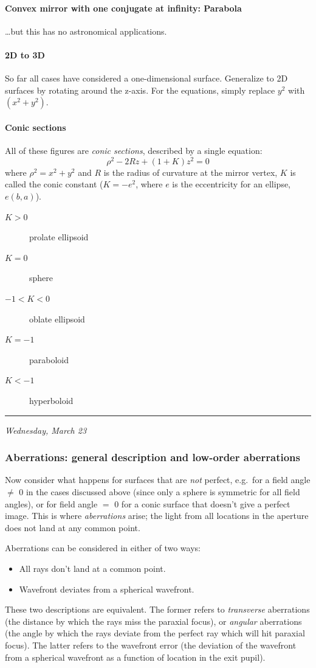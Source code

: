 \documentclass[12pt]{article}
\newcommand{\mydate}[1]{
    \begin{flushright}
        \rule{\textwidth}{0.4pt} %
        \footnotesize\hfill\textit{#1}
    \end{flushright}}
\begin{document}
\paragraph{Convex mirror with one conjugate at infinity: Parabola}
\ldots but this has no astronomical applications.

\paragraph{2D to 3D}
So far all cases have considered a one-dimensional surface.
Generalize to 2D surfaces by rotating around the z-axis.
For the equations, simply replace $y^{2}$ with $(x^{2} + y^{2})$.

\paragraph{Conic sections}
All of these figures are
\emph{conic sections}, described by a single equation:
\[
    \rho^{2} - 2Rz + (1+K)z^{2} = 0
    \]
where $ \rho^{2} = x^{2} + y^{2} $
and $R$ is the radius of curvature at the mirror vertex,
$K$ is called the conic constant ($K = -e^{2}$, where $e$ is the eccentricity for
an ellipse, $e(b, a)$).
\begin{description}
    \item [$K > 0$] prolate ellipsoid
    \item [$K = 0$] sphere
    \item [$-1 < K < 0$] oblate ellipsoid
    \item [$K = - 1$] paraboloid
    \item [$K < - 1$] hyperboloid
\end{description}

\mydate{Wednesday, March 23}
\subsubsection{Aberrations: general description and low-order aberrations}
Now consider what happens for surfaces that are \emph{not} perfect, e.g.\ for a
field angle $\neq$ 0 in the cases discussed above (since only a sphere is
symmetric for all field angles), or for field angle $=$ 0 for a conic surface
that doesn't give a perfect image. This is where \textit{aberrations} arise;
the light from all locations in the aperture does not land at any common point.

Aberrations can be considered in either of two ways:
\begin{itemize}
    \item All rays don't land at a common point.
    \item Wavefront deviates from a spherical wavefront.
\end{itemize}
These two descriptions are equivalent. The former refers to \textit{transverse}
aberrations (the distance by which the rays miss the paraxial focus), or
\textit{angular} aberrations (the angle by which the rays deviate from the
perfect ray which will hit paraxial focus). The latter refers to the wavefront
error (the deviation of the wavefront from a spherical wavefront as a function
of location in the exit pupil).
\end{document}

